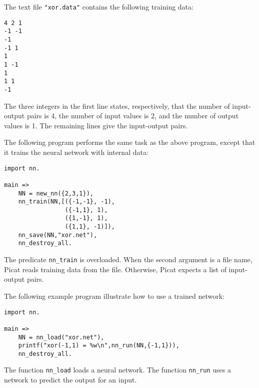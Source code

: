 The text file \texttt{"xor.data"} contains the following training data:
\begin{verbatim}
4 2 1
-1 -1
-1
-1 1
1
1 -1
1
1 1
-1
\end{verbatim}
The three integers in the first line states, respectively, that the number of input-output pairs is 4, the number of input values is 2, and the number of output values is 1. The remaining lines give the input-output pairs. 

The following program performs the same task as the above program, except that it trains the neural network with internal data:
\begin{verbatim}
import nn.

main =>
    NN = new_nn({2,3,1}),
    nn_train(NN,[({-1,-1}, -1), 
                 ({-1,1}, 1), 
                 ({1,-1}, 1), 
                 ({1,1}, -1)]),
    nn_save(NN,"xor.net"),
    nn_destroy_all.
\end{verbatim}
The predicate \texttt{nn\_train} is overloaded. When the second argument is a file name, Picat reads training data from the file. Otherwise, Picat expects a list of input-output pairs.

The following example program illustrate how to use a trained network:
\begin{verbatim}
import nn.

main =>
    NN = nn_load("xor.net"),
    printf("xor(-1,1) = %w\n",nn_run(NN,{-1,1})),
    nn_destroy_all.
\end{verbatim}
The function \texttt{nn\_load} loads a neural network. The function \texttt{nn\_run} uses a network to predict the output for an input.

